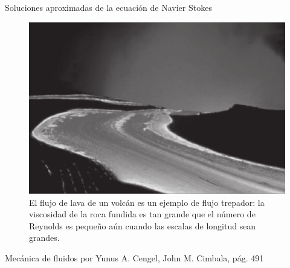 \begin{frame}{Soluciones aproximadas de la ecuación de Navier Stokes}
\justifying

\begin{figure}[H]
\centering
\includegraphics[scale=0.2]{Section_Files/S3-imagenes-Jhon/0001.png}
\caption{El flujo de lava de un volcán es un ejemplo de flujo trepador: la viscosidad de la roca fundida es tan grande que el número de Reynolds es pequeño aún cuando las escalas de longitud sean grandes.}
\end{figure}

{\tiny Mecánica de fluidos por Yunus A. Cengel, John M. Cimbala, pág. 491}
\end{frame}

